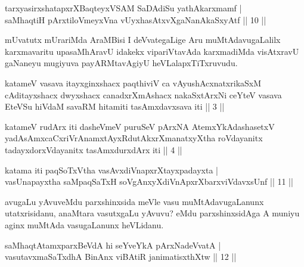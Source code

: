 
\begin{shl}
tarxyasirxshatapxrXBaqteyxVSAM SaDAdiSu yathAkarxmamf |\\
saMhaqtiH pArxtiloVmeyxVna \footnotemark[1]{}vUyxhasAtxvXgaNanAkaSxyAtf \hfill || 10 ||
\end{shl}

\begin{artha}
mUvatutx mUrariMda AraMBisi I deVvategaLige Aru muMtAdavugaLalilx karxmavaritu upasaMhAravU idakekx vipariVtavAda karxmadiMda  visAtxravU gaNaneyu mugiyuva payARMtavAgiyU heVLalapxTiTxruvudu.
\end{artha}

\begin{shl}
katameV vasava itayxginxshacx paqthiviV ca vAyushAcxnatxrikaSxM cAditayxshacx dwyxshacx canadxrXmAshacx nakaSxtArxNi ceYteV vasava EteVSu hiVdaM savaRM hitamiti tasAmxdavxsava iti || 3 ||
\end{shl}

\begin{shl}
katameV rudArx iti dasheVmeV puruSeV pArxNA AtemxYkAdashasetxV yadAsAmxcaCxriVrAnamxtAyxRdutAkxrXmanatxyXtha roVdayanitx tadayxdorxVdayanitx tasAmxdurxdArx iti || 4 ||
\end{shl}

\begin{shl}
katama iti paqSoTxV\s tha vasAvxdiVnapxrXtayxpadayxta |\\
vasUnapayxtha saMpaqSaTxH soV\s gAnxyXdiVnApxrXbarxviVdavxsUnf \hfill || 11 ||
\end{shl}

\begin{artha}
avugaLu yAvuveMdu parxshinxsida meVle vasu muMtAdavugaLanunx utatxrisidanu, anaMtara vasutxgaLu yAvuvu? eMdu parxshinxsidAga A muniyu aginx muMtAda vasugaLanunx heVLidanu.
\end{artha}

\begin{shl}
saMhaqtAtamxparxBeVdA hi seYveYkA pArxNadeVvatA |\\
vasutavx\footnotemark[2]{}maSaTxdhA BinAnx viBAtiR janimatisxthXtw \hfill || 12 ||
\end{shl}


